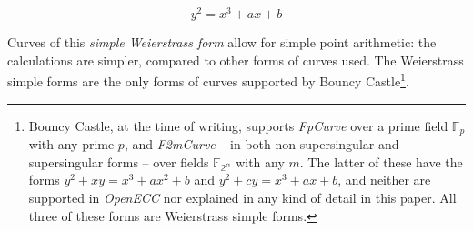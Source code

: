 \begin{equation}
	y^2 = x^3 + ax + b
\end{equation}

Curves of this \emph{simple Weierstrass form} allow for simple point arithmetic: the
calculations are simpler, compared to other forms of curves used. The Weierstrass simple forms are
the only forms of curves supported by Bouncy Castle\footnote{Bouncy Castle, at the time of writing,
supports \emph{FpCurve} over a prime field \(\mathbb{F}_p\) with any prime \(p\), and \emph{F2mCurve}
-- in both non-supersingular and supersingular forms -- over fields \(\mathbb{F_{2^m}}\) with any \(m\).
The latter of these have the forms \(y^2 + xy = x^3 + ax^2 + b\) and
\(y^2 + cy = x^3 + ax + b\), and neither are supported in \emph{OpenECC} nor explained in any kind
of detail in this paper. All three of these forms are Weierstrass simple forms.}.